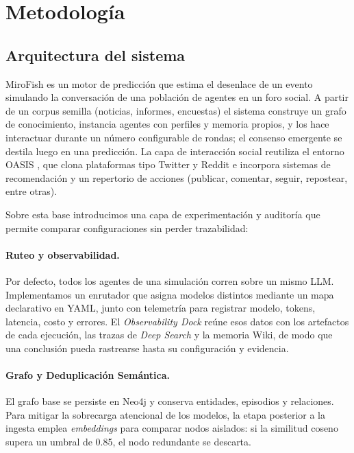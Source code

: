 \documentclass[11pt]{article}
\begin{document}
\section{Metodología}
\label{sec:metodologia}

\subsection{Arquitectura del sistema}

MiroFish \citep{mirofish2025} es un motor de predicción que estima el desenlace de un evento simulando la conversación de una población de agentes en un foro social. A partir de un corpus semilla (noticias, informes, encuestas) el sistema construye un grafo de conocimiento, instancia agentes con perfiles y memoria propios, y los hace interactuar durante un número configurable de rondas; el consenso emergente se destila luego en una predicción. La capa de interacción social reutiliza el entorno OASIS \citep{yang2024oasis}, que clona plataformas tipo Twitter y Reddit e incorpora sistemas de recomendación y un repertorio de acciones (publicar, comentar, seguir, repostear, entre otras).

Sobre esta base introducimos una capa de experimentación y auditoría que permite comparar configuraciones sin perder trazabilidad:

\paragraph{Ruteo y observabilidad.} Por defecto, todos los agentes de una simulación corren sobre un mismo LLM. Implementamos un enrutador que asigna modelos distintos mediante un mapa declarativo en YAML, junto con telemetría para registrar modelo, tokens, latencia, costo y errores. El \textit{Observability Dock} reúne esos datos con los artefactos de cada ejecución, las trazas de \textit{Deep Search} y la memoria Wiki, de modo que una conclusión pueda rastrearse hasta su configuración y evidencia.

\paragraph{Grafo y Deduplicación Semántica.} El grafo base se persiste en Neo4j y conserva entidades, episodios y relaciones. Para mitigar la sobrecarga atencional de los modelos, la etapa posterior a la ingesta emplea \textit{embeddings} para comparar nodos aislados: si la similitud coseno supera un umbral de 0.85, el nodo redundante se descarta.
\end{document}
